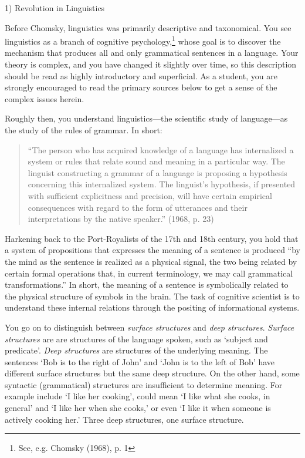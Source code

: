 \begin{refsection}
1) Revolution in Linguistics

Before Chomsky, linguistics was primarily descriptive and taxonomical. You see linguistics as a branch of cognitive psychology,\footnote{See, e.g. Chomsky (1968), p. 1} whose goal is to discover the mechanism that produces all and only grammatical sentences in a language. Your theory is complex, and you have changed it slightly over time, so this description should be read as highly introductory and superficial. As a student, you are strongly encouraged to read the primary sources below to get a sense of the complex issues herein.

Roughly then, you understand linguistics—the scientific study of language—as the study of the rules of grammar. In short:

\begin{quote}

“The person who has acquired knowledge of a language has internalized a system or rules that relate sound and meaning in a particular way. The linguist constructing a grammar of a language is proposing a hypothesis concerning this internalized system. The linguist's hypothesis, if presented with sufficient explicitness and precision, will have certain empirical consequences with regard to the form of utterances and their interpretations by the native speaker.” (1968, p. 23)
\end{quote}

Harkening back to the Port-Royalists of the 17th and 18th century, you hold that a system of propositions that expresses the meaning of a sentence is produced “by the mind as the sentence is realized as a physical signal, the two being related by certain formal operations that, in current terminology, we may call grammatical transformations.” In short, the meaning of a sentence is symbolically related to the physical structure of symbols in the brain. The task of cognitive scientist is to understand these internal relations through the positing of informational systems.

You go on to distinguish between \emph{surface structures} and \emph{deep structures}. \emph{Surface structures} are are structures of the language spoken, such as `subject and predicate'. \emph{Deep structures} are structures of the underlying meaning. The sentences `Bob is to the right of John' and `John is to the left of Bob' have different surface structures but the same deep structure. On the other hand, some syntactic (grammatical) structures are insufficient to determine meaning. For example include `I like her cooking', could mean `I like what she cooks, in general' and `I like her when she cooks,' or even `I like it when someone is actively cooking her.' Three deep structures, one surface structure.


\end{refsection}
